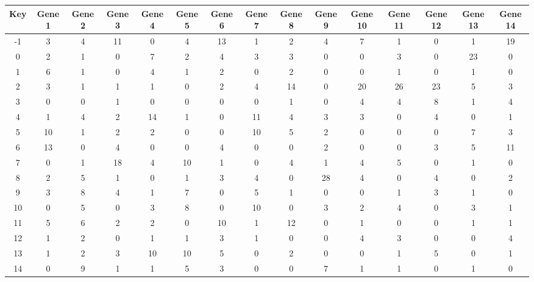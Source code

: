 \begin{tabular}{|c|c|c|c|c|c|c|c|c|c|c|c|c|c|c|}
\hline
Key & Gene 1 & Gene 2 & Gene 3 & Gene 4 & Gene 5 & Gene 6 & Gene 7 & Gene 8 & Gene 9 & Gene 10 & Gene 11 & Gene 12 & Gene 13 & Gene 14 \\
\hline
-1 & 3 & 4 & 11 & 0 & 4 & 13 & 1 & 2 & 4 & 7 & 1 & 0 & 1 & 19 \\
0 & 2 & 1 & 0 & 7 & 2 & 4 & 3 & 3 & 0 & 0 & 3 & 0 & 23 & 0 \\
1 & 6 & 1 & 0 & 4 & 1 & 2 & 0 & 2 & 0 & 0 & 1 & 0 & 1 & 0 \\
2 & 3 & 1 & 1 & 1 & 0 & 2 & 4 & 14 & 0 & 20 & 26 & 23 & 5 & 3 \\
3 & 0 & 0 & 1 & 0 & 0 & 0 & 0 & 1 & 0 & 4 & 4 & 8 & 1 & 4 \\
4 & 1 & 4 & 2 & 14 & 1 & 0 & 11 & 4 & 3 & 3 & 0 & 4 & 0 & 1 \\
5 & 10 & 1 & 2 & 2 & 0 & 0 & 10 & 5 & 2 & 0 & 0 & 0 & 7 & 3 \\
6 & 13 & 0 & 4 & 0 & 0 & 4 & 0 & 0 & 2 & 0 & 0 & 3 & 5 & 11 \\
7 & 0 & 1 & 18 & 4 & 10 & 1 & 0 & 4 & 1 & 4 & 5 & 0 & 1 & 0 \\
8 & 2 & 5 & 1 & 0 & 1 & 3 & 4 & 0 & 28 & 4 & 0 & 4 & 0 & 2 \\
9 & 3 & 8 & 4 & 1 & 7 & 0 & 5 & 1 & 0 & 0 & 1 & 3 & 1 & 0 \\
10 & 0 & 5 & 0 & 3 & 8 & 0 & 10 & 0 & 3 & 2 & 4 & 0 & 3 & 1 \\
11 & 5 & 6 & 2 & 2 & 0 & 10 & 1 & 12 & 0 & 1 & 0 & 0 & 1 & 1 \\
12 & 1 & 2 & 0 & 1 & 1 & 3 & 1 & 0 & 0 & 4 & 3 & 0 & 0 & 4 \\
13 & 1 & 2 & 3 & 10 & 10 & 5 & 0 & 2 & 0 & 0 & 1 & 5 & 0 & 1 \\
14 & 0 & 9 & 1 & 1 & 5 & 3 & 0 & 0 & 7 & 1 & 1 & 0 & 1 & 0 \\
\hline
\end{tabular}